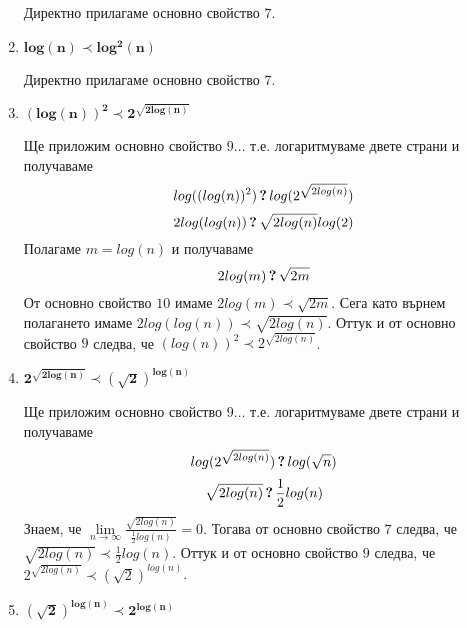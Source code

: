 \begin{solution}
\begin{enumerate}[label=\textbf{\arabic*.}]
		Директно прилагаме основно свойство $\hyperref[mprop-1]{7}$.
		
		
		\vspace{0.2cm}
		\item $\bm{log(n)\prec log^2(n)}$
		
		Директно прилагаме основно свойство $\hyperref[mprop-1]{7}$.
		
		
		\vspace{0.2cm}
		\item $\bm{(log(n))^2\prec2^{\sqrt{2log(n)}}}$
		
		Ще приложим основно свойство $\hyperref[mprop-1]{9}\dots$ т.е. логаритмуваме двете страни и получаваме
		\begin{equation*}
			log((log(n))^2)\,\textbf?\,log(2^{\sqrt{2log(n)}})
		\end{equation*}
		\begin{equation*}
			2log(log(n))\,\textbf?\,\sqrt{2log(n)}log(2)
		\end{equation*}
		Полагаме $m=log(n)$ и получаваме
		\begin{equation*}
			2log(m)\,\textbf?\,\sqrt{2m}
		\end{equation*}
		От основно свойство $\hyperref[mprop-1]{10}$ имаме $2log(m)\prec\sqrt{2m}$. Сега като върнем полагането имаме $2log(log(n))\prec\sqrt{2log(n)}$. Оттук и от основно свойство $\hyperref[mprop-1]{9}$ следва, че $(log(n))^2\prec2^{\sqrt{2log(n)}}$.
		
		
		\vspace{0.2cm}
		\item $\bm{2^{\sqrt{2log(n)}}\prec(\sqrt2)^{log(n)}}$
		
		Ще приложим основно свойство $\hyperref[mprop-1]{9}\dots$ т.е. логаритмуваме двете страни и получаваме
		\begin{equation*}
			log(2^{\sqrt{2log(n)}})\,\textbf?\,log(\sqrt n)
		\end{equation*}
		\begin{equation*}
			\sqrt{2log(n)}\,\textbf?\,\frac12log(n)
		\end{equation*}
		Знаем, че $\lim\limits_{n\to\infty}\frac{\sqrt{2log(n)}}{\frac12log(n)}=0$. Тогава от основно свойство $\hyperref[mprop-1]{7}$ следва, че $\sqrt{2log(n)}\prec \frac12log(n)$. Оттук и от основно свойство $\hyperref[mprop-1]{9}$ следва, че $2^{\sqrt{2log(n)}}\prec(\sqrt2)^{log(n)}$.
		
		
		\vspace{0.2cm}
		\item $\bm{(\sqrt2)^{log(n)}\prec2^{log(n)}}$
		

\end{enumerate}
\end{solution}
